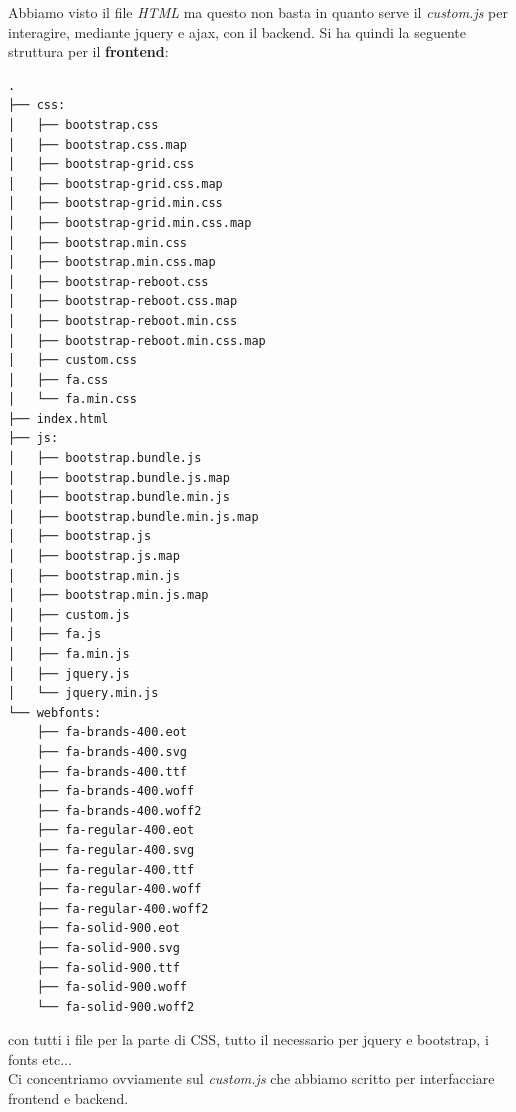 \documentclass[a4paper,12pt, oneside]{book}
\begin{document}
\newpage
Abbiamo visto il file \textit{HTML} ma questo non basta in quanto serve il \textit{custom.js} per interagire, mediante jquery e ajax, con il backend. Si ha quindi la seguente struttura per il \textbf{frontend}:
\begin{shaded}
\begin{verbatim}
.
├── css:
│   ├── bootstrap.css
│   ├── bootstrap.css.map
│   ├── bootstrap-grid.css
│   ├── bootstrap-grid.css.map
│   ├── bootstrap-grid.min.css
│   ├── bootstrap-grid.min.css.map
│   ├── bootstrap.min.css
│   ├── bootstrap.min.css.map
│   ├── bootstrap-reboot.css
│   ├── bootstrap-reboot.css.map
│   ├── bootstrap-reboot.min.css
│   ├── bootstrap-reboot.min.css.map
│   ├── custom.css
│   ├── fa.css
│   └── fa.min.css
├── index.html
├── js:
│   ├── bootstrap.bundle.js
│   ├── bootstrap.bundle.js.map
│   ├── bootstrap.bundle.min.js
│   ├── bootstrap.bundle.min.js.map
│   ├── bootstrap.js
│   ├── bootstrap.js.map
│   ├── bootstrap.min.js
│   ├── bootstrap.min.js.map
│   ├── custom.js
│   ├── fa.js
│   ├── fa.min.js
│   ├── jquery.js
│   └── jquery.min.js
└── webfonts:
    ├── fa-brands-400.eot
    ├── fa-brands-400.svg
    ├── fa-brands-400.ttf
    ├── fa-brands-400.woff
    ├── fa-brands-400.woff2
    ├── fa-regular-400.eot
    ├── fa-regular-400.svg
    ├── fa-regular-400.ttf
    ├── fa-regular-400.woff
    ├── fa-regular-400.woff2
    ├── fa-solid-900.eot
    ├── fa-solid-900.svg
    ├── fa-solid-900.ttf
    ├── fa-solid-900.woff
    └── fa-solid-900.woff2
\end{verbatim}
\end{shaded}
con tutti i file per la parte di CSS, tutto il necessario per jquery e bootstrap, i fonts etc...\\
Ci concentriamo ovviamente sul \textit{custom.js} che abbiamo scritto per interfacciare frontend e backend.
\end{document}
